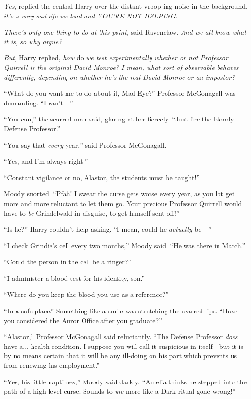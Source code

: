 \emph{Yes,} replied the central Harry over the distant vroop-ing noise in the background, \emph{it’s a very sad life we lead and YOU’RE NOT HELPING.}

\emph{There’s only one thing to do at this point,} said Ravenclaw. \emph{And we all know what it is, so why argue?}

\emph{But,} Harry replied, \emph{how} do \emph{we test experimentally whether or not Professor Quirrell is the original David Monroe? I mean, what sort of observable behaves differently, depending on whether he’s the real David Monroe or an impostor?}

“What do you want me to do about it, Mad-Eye?” Professor McGonagall was demanding. “I can’t—”

“You can,” the scarred man said, glaring at her fiercely. “Just fire the bloody Defense Professor.”

“You say that \emph{every} year,” said Professor McGonagall.

“Yes, and I’m always right!”

“Constant vigilance or no, Alastor, the students must be taught!”

Moody snorted. “Pfah! I swear the curse gets worse every year, as you lot get more and more reluctant to let them go. Your precious Professor Quirrell would have to \emph{be} Grindelwald in disguise, to get himself sent off!”

“Is he?” Harry couldn’t help asking. “I mean, could he \emph{actually} be—”

“I check Grindie’s cell every two months,” Moody said. “He was there in March.”

“Could the person in the cell be a ringer?”

“I administer a blood test for his identity, son.”

“Where do you keep the blood you use as a reference?”

“In a safe place.” Something like a smile was stretching the scarred lips. “Have you considered the Auror Office after you graduate?”

“Alastor,” Professor McGonagall said reluctantly. “The Defense Professor \emph{does} have a... health condition. I suppose you will call it suspicious in itself—but it is by no means certain that it will be any ill-doing on his part which prevents us from renewing his employment.”

“Yes, his little naptimes,” Moody said darkly. “Amelia thinks he stepped into the path of a high-level curse. Sounds to \emph{me} more like a Dark ritual gone wrong!”

